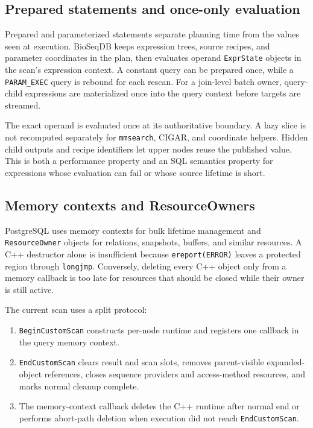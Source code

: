 \subsection{Prepared statements and once-only evaluation}

Prepared and parameterized statements separate planning time from the values
seen at execution.  BioSeqDB keeps expression trees, source recipes, and
parameter coordinates in the plan, then evaluates operand \texttt{ExprState}
objects in the scan's expression context.  A constant query can be prepared
once, while a \texttt{PARAM\_EXEC} query is rebound for each rescan.  For a
join-level batch owner, query-child expressions are materialized once into
the query context before targets are streamed.

The exact operand is evaluated once at its authoritative boundary.  A lazy
slice is not recomputed separately for \texttt{mmsearch}, CIGAR, and
coordinate helpers.  Hidden child outputs and recipe identifiers let upper
nodes reuse the published value.  This is both a performance property and an
SQL semantics property for expressions whose evaluation can fail or whose
source lifetime is short.

\subsection{Memory contexts and ResourceOwners}

PostgreSQL uses memory contexts for bulk lifetime management and
\texttt{ResourceOwner} objects for relations, snapshots, buffers, and similar
resources.  A C++ destructor alone is insufficient because
\texttt{ereport(ERROR)} leaves a protected region through \texttt{longjmp}.
Conversely, deleting every C++ object only from a memory callback is too late
for resources that should be closed while their owner is still active.

The current scan uses a split protocol:

\begin{enumerate}
  \item \texttt{BeginCustomScan} constructs per-node runtime and registers one
  callback in the query memory context.
  \item \texttt{EndCustomScan} clears result and scan slots, removes
  parent-visible expanded-object references, closes sequence providers and
  access-method resources, and marks normal cleanup complete.
  \item The memory-context callback deletes the C++ runtime after normal end
  or performs abort-path deletion when execution did not reach
  \texttt{EndCustomScan}.
\end{enumerate}

